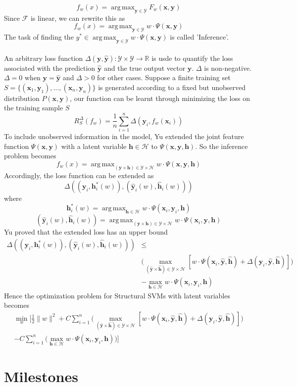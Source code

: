 \documentclass{article}
\DeclareMathOperator*{\argmax}{arg\,max}
\begin{document}
	$$ f_w(x) = \argmax_{\mathbf{y}\in\mathcal{Y}} F_w(\mathbf{x},\mathbf{y})$$
	Since $\mathcal{F}$ is linear, we can rewrite this as
	$$ f_w(x) = \argmax_{\mathbf{y}\in\mathcal{Y}} w\cdot\Psi(\mathbf{x},\mathbf{y})$$
	The task of finding the $y^* \in \argmax_{\mathbf{y}\in\mathcal{Y}} w\cdot\Psi(\mathbf{x},\mathbf{y})$ is called 'Inference'.
	\\\\
	An arbitrary loss function $\Delta(\mathbf{y},\hat{\mathbf{y}}) : \mathcal{Y}\times\mathcal{Y}\rightarrow\mathbb{R}
	$ is usde to quantify the loss associated with the prediction $\mathbf{\hat{y}}$ and the true output vector $\mathbf{y}$. $\Delta$ is non-negative. $\Delta = 0$ when $\mathbf{y} = \mathbf{\hat{y}}$ and $\Delta > 0$ for other cases. Suppose a finite training set $S=\{ ( \mathbf{x}_1,\mathbf{y}_1) ,\dots ,( \mathbf{x}_n,\mathbf{y}_n ) \}$ is generated according to a fixed but unobserved distribution $P(\mathbf{x},\mathbf{y})$, our function can be learnt through minimizing the loss on the training sample $S$
	$$
	R^\Delta_S(f_w) = \frac{1}{n}\sum_{i=1}^{n}\Delta(\mathbf{y}_i,f_w(\mathbf{x}_i))
	$$
	To include unobserved information in the model, Yu\cite{yu2009learning} extended the joint feature function  $\Psi(\mathbf{x},\mathbf{y}) $ with a latent variable $\mathbf{h}\in \mathcal{H}$ to $\Psi(\mathbf{x},\mathbf{y},\mathbf{h}) $. So the inference problem becomes
	$$
	 f_w(x) = \argmax_{(\mathbf{y} \times \mathbf{h}) \in \mathcal{Y} \times \mathcal{H}} w\cdot\Psi(\mathbf{x},\mathbf{y},\mathbf{h})
	$$
	Accordingly, the loss function can be extended as
	$$
	\Delta((\mathbf{y}_i,\mathbf{h}^*_i(w)),(\mathbf{\hat{y}}_i(w),\mathbf{\hat{h}}_i(w)))
	$$
	where
	$$
	\mathbf{h}^*_i(w) = \argmax_{\mathbf{h} \in \mathcal{H}} w \cdot \Psi(\mathbf{x}_i,\mathbf{y}_i,\mathbf{h})
	$$
	$$
	(\mathbf{\hat{y}}_i(w),\mathbf{\hat{h}}_i(w))=\argmax_{(\mathbf{y} \times \mathbf{h}) \in \mathcal{Y} \times \mathcal{H}} w\cdot\Psi(\mathbf{x}_i,\mathbf{y},\mathbf{h})
	$$
	Yu\cite{yu2009learning} proved that the extended loss has an upper bound
	\begin{align*}
		\Delta((\mathbf{y}_i,\mathbf{h}^*_i(w)),(\mathbf{\hat{y}}_i(w),\mathbf{\hat{h}}_i(w)))
		&\leq\\
		&\bigg(\max_{(\mathbf{\hat{y}} \times \mathbf{\hat{h}}) \in \mathcal{Y} \times \mathcal{H}} [w\cdot\Psi(\mathbf{x}_i,\mathbf{\hat{y}},\mathbf{\hat{h}}) + \Delta(\mathbf{y}_i,\mathbf{\hat{y}},\mathbf{\hat{h}})]\bigg)\\
		&-\max_{\mathbf{h} \in \mathcal{H}} w \cdot \Psi(\mathbf{x}_i,\mathbf{y}_i,\mathbf{h})
	\end{align*}
	Hence the optimization problem for Structural SVMs with latent variables becomes
	\begin{align*}
	\min_w\bigg[\frac{1}{2}\|w\|^2+
	C\sum_{i=1}^{n}\big(\max_{(\mathbf{\hat{y}} \times \mathbf{\hat{h}}) \in \mathcal{Y} \times \mathcal{H}} [w\cdot\Psi(\mathbf{x}_i,\mathbf{\hat{y}},\mathbf{\hat{h}}) + \Delta(\mathbf{y}_i,\mathbf{\hat{y}},\mathbf{\hat{h}})]\big)\\
	-C\sum_{i=1}^{n}\big(\max_{\mathbf{h} \in \mathcal{H}} w \cdot \Psi(\mathbf{x}_i,\mathbf{y}_i,\mathbf{h})\big)\bigg]
	\end{align*}
	
	\section{Milestones}
	
	\renewcommand\refname{Bibliography}
	
	
\end{document}
